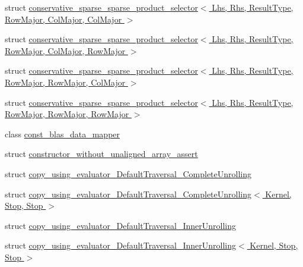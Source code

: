 \begin{DoxyCompactItemize}
\item 
struct \hyperlink{struct_eigen_1_1internal_1_1conservative__sparse__sparse__product__selector_3_01_lhs_00_01_rhs_0434d91bd03f3817d20ac2e65c68dd100}{conservative\+\_\+sparse\+\_\+sparse\+\_\+product\+\_\+selector$<$ Lhs, Rhs, Result\+Type, Row\+Major, Col\+Major, Col\+Major $>$}
\item 
struct \hyperlink{struct_eigen_1_1internal_1_1conservative__sparse__sparse__product__selector_3_01_lhs_00_01_rhs_0213e811a66030985a0822b6b604bb6aa}{conservative\+\_\+sparse\+\_\+sparse\+\_\+product\+\_\+selector$<$ Lhs, Rhs, Result\+Type, Row\+Major, Col\+Major, Row\+Major $>$}
\item 
struct \hyperlink{struct_eigen_1_1internal_1_1conservative__sparse__sparse__product__selector_3_01_lhs_00_01_rhs_09c6df8c1cfe8f5011ca309f86919cf1f}{conservative\+\_\+sparse\+\_\+sparse\+\_\+product\+\_\+selector$<$ Lhs, Rhs, Result\+Type, Row\+Major, Row\+Major, Col\+Major $>$}
\item 
struct \hyperlink{struct_eigen_1_1internal_1_1conservative__sparse__sparse__product__selector_3_01_lhs_00_01_rhs_01e3769f60835369078028e205b540c14}{conservative\+\_\+sparse\+\_\+sparse\+\_\+product\+\_\+selector$<$ Lhs, Rhs, Result\+Type, Row\+Major, Row\+Major, Row\+Major $>$}
\item 
class \hyperlink{class_eigen_1_1internal_1_1const__blas__data__mapper}{const\+\_\+blas\+\_\+data\+\_\+mapper}
\item 
struct \hyperlink{struct_eigen_1_1internal_1_1constructor__without__unaligned__array__assert}{constructor\+\_\+without\+\_\+unaligned\+\_\+array\+\_\+assert}
\item 
struct \hyperlink{struct_eigen_1_1internal_1_1copy__using__evaluator___default_traversal___complete_unrolling}{copy\+\_\+using\+\_\+evaluator\+\_\+\+Default\+Traversal\+\_\+\+Complete\+Unrolling}
\item 
struct \hyperlink{struct_eigen_1_1internal_1_1copy__using__evaluator___default_traversal___complete_unrolling_3_01c1b4c78ce0d389049a18ce1f9fdd8138}{copy\+\_\+using\+\_\+evaluator\+\_\+\+Default\+Traversal\+\_\+\+Complete\+Unrolling$<$ Kernel, Stop, Stop $>$}
\item 
struct \hyperlink{struct_eigen_1_1internal_1_1copy__using__evaluator___default_traversal___inner_unrolling}{copy\+\_\+using\+\_\+evaluator\+\_\+\+Default\+Traversal\+\_\+\+Inner\+Unrolling}
\item 
struct \hyperlink{struct_eigen_1_1internal_1_1copy__using__evaluator___default_traversal___inner_unrolling_3_01_kernel_00_01_stop_00_01_stop_01_4}{copy\+\_\+using\+\_\+evaluator\+\_\+\+Default\+Traversal\+\_\+\+Inner\+Unrolling$<$ Kernel, Stop, Stop $>$}

\end{DoxyCompactItemize}
